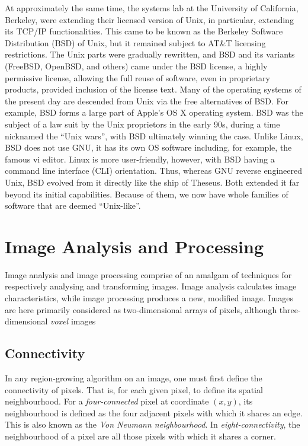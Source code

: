 \documentclass[11pt]{amsart}
\begin{document}
At approximately the same time, the systems lab at the University of California, Berkeley, were extending their licensed version of Unix, in particular, extending its TCP/IP functionalities. This came to be known as the Berkeley Software Distribution (BSD) of Unix, but it remained subject to AT\&T licensing restrictions. The Unix parts were gradually rewritten, and BSD and its variants (FreeBSD, OpenBSD, and others) came under the BSD license, a highly permissive license, allowing the full reuse of software, even in proprietary products, provided inclusion of the license text. Many of the operating systems of the present day are descended from Unix via the free alternatives of BSD. For example, BSD forms a large part of Apple's OS X operating system. BSD was the subject of a law suit by the Unix proprietors in the early 90s, during a time nicknamed the ``Unix wars'', with BSD ultimately winning the case. Unlike Linux, BSD does not use GNU, it has its own OS software including, for example, the famous vi editor. Linux is more user-friendly, however, with BSD having a command line interface (CLI) orientation. Thus, whereas GNU reverse engineered Unix, BSD evolved from it directly like the ship of Theseus. Both extended it far beyond its initial capabilities. Because of them, we now have whole families of software that are deemed ``Unix-like''.

\section{Image Analysis and Processing}

Image analysis and image processing comprise of an amalgam of techniques for respectively analysing and transforming images. Image analysis calculates image characteristics, while image processing produces a new, modified image. Images are here primarily considered as two-dimensional arrays of pixels, although three-dimensional \emph{voxel} images 

\subsection{Connectivity}

In any region-growing algorithm on an image, one must first define the connectivity of pixels. That is, for each given pixel, to define its spatial neighbourhood. For a \emph{four-connected} pixel at coordinate $(x, y)$, its neighbourhood is defined as the four adjacent pixels with which it shares an edge. This is also known as the \emph{Von Neumann neighbourhood}. In \emph{eight-connectivity}, the neighbourhood of a pixel are all those pixels with which it shares a corner.
\end{document}
